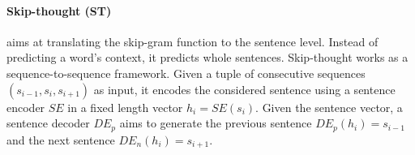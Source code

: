 






\paragraph{Skip-thought (ST)} \textcite{kiros_15} aims at translating the skip-gram function to the sentence level. Instead of predicting a word's context, it predicts whole sentences. Skip-thought works as a sequence-to-sequence framework. Given a tuple of consecutive sequences $(s_{i-1}, s_i, s_{i+1})$ as input, it encodes the considered sentence using a sentence encoder $SE$ in a fixed length vector $h_i = SE(s_i)$. Given the sentence vector, a sentence decoder $DE_p$ aims to generate the previous sentence $DE_p(h_i) = s_{i-1}$ and the next sentence $DE_n(h_i) = s_{i+1}$.

